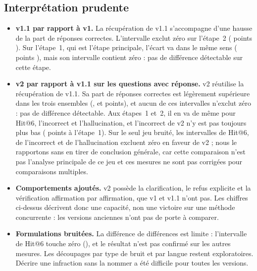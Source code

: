 \subsection{Interprétation prudente}\label{sec:interpretation}

\begin{itemize}
  \item \textbf{v1.1 par rapport à v1.} La récupération de v1.1 s'accompagne d'une hausse de la part de réponses correctes. L'intervalle
        exclut zéro sur l'étape~2 (\EvDiffStwoVoneoneVoneCorrect{} points \EvDiffStwoVoneoneVoneCorrectCI). Sur l'étape~1, qui est l'étape
        principale, l'écart va dans le même sens (\EvDiffSoneVoneoneVoneCorrect{} points \EvDiffSoneVoneoneVoneCorrectCI), mais son
        intervalle contient zéro : pas de différence détectable sur cette étape.
  \item \textbf{v2 par rapport à v1.1 sur les questions avec réponse.} v2 réutilise la récupération de v1.1. Sa part de réponses
        correctes est légèrement supérieure dans les trois ensembles (\EvDiffSoneVtwoVoneoneCorrect, \EvDiffStwoVtwoVoneoneCorrect{} et
        \EvDiffSnoisyVtwoVoneoneCorrect{} points), et aucun de ces intervalles n'exclut zéro : pas de différence détectable. Aux
        étapes~1 et~2, il en va de même pour Hit@6, l'incorrect et l'hallucination, et l'incorrect de v2 n'y est pas toujours plus
        bas (\EvDiffSoneVtwoVoneoneIncorrect{} points à l'étape~1). Sur le seul jeu bruité, les intervalles de Hit@6, de l'incorrect et de
        l'hallucination excluent zéro en faveur de v2 ; nous le rapportons sans en tirer de conclusion générale, car cette comparaison
        n'est pas l'analyse principale de ce jeu et ces mesures ne sont pas corrigées pour comparaisons multiples.
  \item \textbf{Comportements ajoutés.} v2 possède la clarification, le refus explicite et la vérification affirmation par
        affirmation, que v1 et v1.1 n'ont pas. Les chiffres ci-dessus décrivent donc une capacité, non une victoire sur une méthode
        concurrente : les versions anciennes n'ont pas de porte à comparer.
  \item \textbf{Formulations bruitées.} La différence de différences est limite : l'intervalle de Hit@6 touche zéro
        (\EvDidVtwoVoneoneHitCI), et le résultat n'est pas confirmé sur les autres mesures. Les découpages par type de bruit et par
        langue restent exploratoires. Décrire une infraction sans la nommer a été difficile pour toutes les versions.

\end{itemize}
